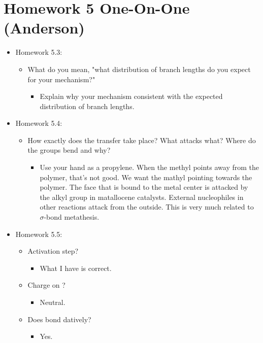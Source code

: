 \documentclass[../notes.tex]{subfiles}
\begin{document}
\section{Homework 5 One-On-One (Anderson)}
\begin{itemize}
    \item Homework 5.3:
    \begin{itemize}
        \item What do you mean, "what distribution of branch lengths do you expect for your mechanism?"
        \begin{itemize}
            \item Explain why your mechanism consistent with the expected distribution of branch lengths.
        \end{itemize}
    \end{itemize}
    \item Homework 5.4:
    \begin{itemize}
        \item How exactly does the transfer take place? What attacks what? Where do the groups bend and why?
        \begin{itemize}
            \item Use your hand as a propylene. When the methyl points away from the polymer, that's not good. We want the mathyl pointing towards the polymer. The face that is bound to the metal center is attacked by the alkyl group in matallocene catalysts. External nucleophiles in other reactions attack from the outside. This is very much related to $\sigma$-bond metathesis.
        \end{itemize}
    \end{itemize}
    \item Homework 5.5:
    \begin{itemize}
        \item Activation step?
        \begin{itemize}
            \item What I have is correct.
        \end{itemize}
        \item Charge on ?
        \begin{itemize}
            \item Neutral.
        \end{itemize}
        \item Does  bond datively?
        \begin{itemize}
            \item Yes.

\end{itemize}
\end{itemize}
\end{itemize}
\end{document}
